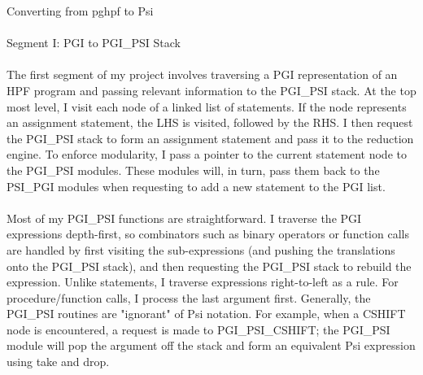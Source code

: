 Converting from pghpf to Psi \\ \\

Segment I: PGI to PGI_PSI Stack \\ \\

The first segment of my project involves traversing a PGI representation
of an HPF program and passing relevant information to the PGI_PSI stack.
At the top most level, I visit each node of a linked list of statements.
If the node represents an assignment statement, the LHS is visited, followed
by the RHS.  I then request the PGI_PSI stack to form an assignment
statement and pass it to the reduction engine.  To enforce modularity,
I pass a pointer to the current statement node to the PGI_PSI modules.  These
modules will, in turn, pass them back to the PSI_PGI modules when requesting
to add a new statement to the PGI list.\\ \\

Most of my PGI_PSI functions are straightforward.  I traverse the PGI
expressions depth-first, so combinators such as binary operators or
function calls are handled by first visiting the sub-expressions (and
pushing the translations onto the PGI_PSI stack), and then requesting
the PGI_PSI stack to rebuild the expression.  Unlike statements, I
traverse expressions right-to-left as a rule.  For procedure/function
calls, I process the last argument first.  Generally, the PGI_PSI routines
are "ignorant" of Psi notation.  For example, when a CSHIFT node is
encountered, a request is made to PGI_PSI_CSHIFT; the PGI_PSI module
will pop the argument off the stack and form an equivalent Psi expression
using take and drop.\\ \\

